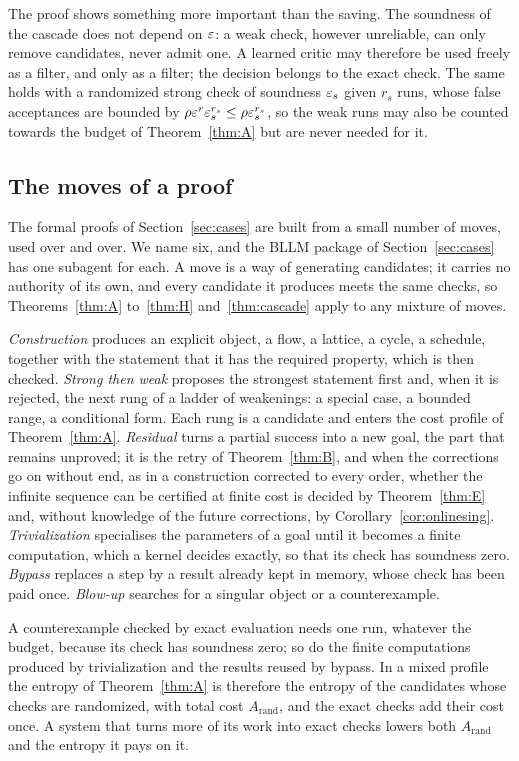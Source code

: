 The proof shows something more important than the saving. The soundness of the cascade does not depend on $\varepsilon$: a weak check, however unreliable, can only remove candidates, never admit one. A learned critic may therefore be used freely as a filter, and only as a filter; the decision belongs to the exact check. The same holds with a randomized strong check of soundness $\varepsilon_{s}$ given $r_{s}$ runs, whose false acceptances are bounded by $\rho\varepsilon^{r}\varepsilon_{s}^{r_{s}}\le\rho\varepsilon_{s}^{r_{s}}$, so the weak runs may also be counted towards the budget of Theorem~\ref{thm:A} but are never needed for it.

\subsection{The moves of a proof}\label{ssec:moves}

The formal proofs of Section~\ref{sec:cases} are built from a small number of moves, used over and over. We name six, and the BLLM package of Section~\ref{sec:cases} has one subagent for each. A move is a way of generating candidates; it carries no authority of its own, and every candidate it produces meets the same checks, so Theorems~\ref{thm:A} to~\ref{thm:H} and~\ref{thm:cascade} apply to any mixture of moves.

\emph{Construction} produces an explicit object, a flow, a lattice, a cycle, a schedule, together with the statement that it has the required property, which is then checked. \emph{Strong then weak} proposes the strongest statement first and, when it is rejected, the next rung of a ladder of weakenings: a special case, a bounded range, a conditional form. Each rung is a candidate and enters the cost profile of Theorem~\ref{thm:A}. \emph{Residual} turns a partial success into a new goal, the part that remains unproved; it is the retry of Theorem~\ref{thm:B}, and when the corrections go on without end, as in a construction corrected to every order, whether the infinite sequence can be certified at finite cost is decided by Theorem~\ref{thm:E} and, without knowledge of the future corrections, by Corollary~\ref{cor:onlinesing}. \emph{Trivialization} specialises the parameters of a goal until it becomes a finite computation, which a kernel decides exactly, so that its check has soundness zero. \emph{Bypass} replaces a step by a result already kept in memory, whose check has been paid once. \emph{Blow-up} searches for a singular object or a counterexample.

\begin{remark}\label{rem:refutation}
A counterexample checked by exact evaluation needs one run, whatever the budget, because its check has soundness zero; so do the finite computations produced by trivialization and the results reused by bypass. In a mixed profile the entropy of Theorem~\ref{thm:A} is therefore the entropy of the candidates whose checks are randomized, with total cost $A_{\mathrm{rand}}$, and the exact checks add their cost once. A system that turns more of its work into exact checks lowers both $A_{\mathrm{rand}}$ and the entropy it pays on it.
\end{remark}

